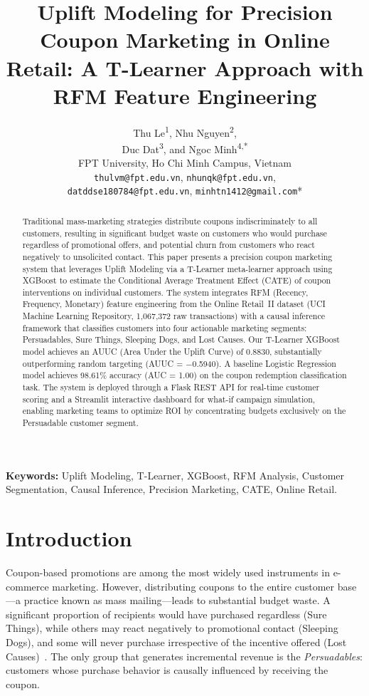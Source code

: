 \documentclass[11pt,a4paper,twoside]{article}
\title{\textbf{Uplift Modeling for Precision Coupon Marketing in Online Retail: A T-Learner Approach with RFM Feature Engineering}}
\author{%
\begin{tabular}{c}
Thu Le\textsuperscript{1}, Nhu Nguyen\textsuperscript{2},\\
Duc Dat\textsuperscript{3}, and Ngoc Minh\textsuperscript{4,*}\\[0.45em]
FPT University, Ho Chi Minh Campus, Vietnam\\[0.25em]
\small\texttt{thulvm@fpt.edu.vn}, \texttt{nhunqk@fpt.edu.vn},\\
\small\texttt{datddse180784@fpt.edu.vn}, \texttt{minhtn1412@gmail.com}*
\end{tabular}
}
\date{}
\begin{document}
\maketitle
\thispagestyle{empty}

\begin{abstract}
Traditional mass-marketing strategies distribute coupons indiscriminately to all customers, resulting in significant budget waste on customers who would purchase regardless of promotional offers, and potential churn from customers who react negatively to unsolicited contact. This paper presents a precision coupon marketing system that leverages Uplift Modeling via a T-Learner meta-learner approach using XGBoost to estimate the Conditional Average Treatment Effect (CATE) of coupon interventions on individual customers. The system integrates RFM (Recency, Frequency, Monetary) feature engineering from the Online Retail~II dataset (UCI Machine Learning Repository, 1,067,372 raw transactions) with a causal inference framework that classifies customers into four actionable marketing segments: Persuadables, Sure Things, Sleeping Dogs, and Lost Causes. Our T-Learner XGBoost model achieves an AUUC (Area Under the Uplift Curve) of 0.8830, substantially outperforming random targeting (AUUC = $-$0.5940). A baseline Logistic Regression model achieves 98.61\% accuracy (AUC = 1.00) on the coupon redemption classification task. The system is deployed through a Flask REST API for real-time customer scoring and a Streamlit interactive dashboard for what-if campaign simulation, enabling marketing teams to optimize ROI by concentrating budgets exclusively on the Persuadable customer segment.
\end{abstract}

\noindent\textbf{Keywords:} Uplift Modeling, T-Learner, XGBoost, RFM Analysis, Customer Segmentation, Causal Inference, Precision Marketing, CATE, Online Retail.

\section{Introduction}

Coupon-based promotions are among the most widely used instruments in e-commerce marketing. However, distributing coupons to the entire customer base---a practice known as mass mailing---leads to substantial budget waste. A significant proportion of recipients would have purchased regardless (Sure Things), while others may react negatively to promotional contact (Sleeping Dogs), and some will never purchase irrespective of the incentive offered (Lost Causes)~\cite{gutierrez2017, radcliffe2011}. The only group that generates incremental revenue is the \textit{Persuadables}: customers whose purchase behavior is causally influenced by receiving the coupon.
\end{document}
